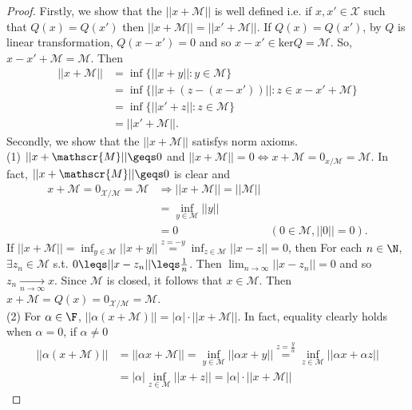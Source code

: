\begin{proof}
    Firstly, we show that the $||x+\mathscr{M}||$ is well defined i.e.
    if $x,x'\in\mathscr{X}$ such that $Q(x)=Q(x')$ then $||x+\mathscr{M}||=||x'+\mathscr{M}||$.
    If $Q(x)=Q(x')$, by $Q$ is linear transformation, $Q(x-x')=0$ and so $x-x'\in \text{ker}Q=\mathscr{M}$. 
    So, $x-x'+\mathscr{M}=\mathscr{M}$.
    Then
    \begin{align*}
        ||x+\mathscr{M}||&=\inf\{||x+y||:y\in\mathscr{M}\}\\
                        &=\inf\{||x+(z-(x-x'))||:z\in x-x'+\mathscr{M}\}\\
                        &=\inf\{||x'+z||:z\in \mathscr{M}\}\\
                        &=||x'+\mathscr{M}||.
    \end{align*}
    Secondly, we show that the $||x+\mathscr{M}||$ satisfys norm axioms.\\
    (1) $||x+\mathscr{M}||\geqs 0$ and $||x+\mathscr{M}||=0\Leftrightarrow x+\mathscr{M}=0_{x/\mathscr{M}}=\mathscr{M}$. 
    In fact, $||x+\mathscr{M}||\geqs 0$ is clear and 
    \begin{align*}
        x+\mathscr{M}=0_{\mathscr{X}/\mathscr{M}}=\mathscr{M}&\Rightarrow ||x+\mathscr{M}||=||\mathscr{M}||\\
        &= \inf_{y\in\mathscr{M}} ||y||\\
        & =0 & (0\in\mathscr{M},||0||=0).
    \end{align*}
        If $||x+\mathscr{M}||=\inf_{y\in\mathscr{M}}||x+y||\overset{z=-y}{=}\inf_{z\in \mathscr{M}}||x-z||=0$, 
        then For each  $n\in\N$, $\exists z_n\in\mathscr{M}$ s.t.
        $0\leqs||x-z_n||\leqs \frac{1}{n}$. Then $\lim_{n\rightarrow \infty}||x-z_n||=0$ and so $z_n\underset{n\rightarrow \infty}{\longrightarrow} x$.
        Since $\mathscr{M}$ is closed, it follows that $x\in\mathscr{M}$. Then $x+\mathscr{M}=Q(x)=0_{\mathscr{X}/\mathscr{M}}=\mathscr{M}$.\\
    (2) For $\alpha\in\F$, $||\alpha (x+\mathscr{M})||=|\alpha|\cdot||x+\mathscr{M}||$. In fact, equality clearly holds when $\alpha=0$, if $\alpha\neq 0$
    \begin{align*}
        ||\alpha(x+\mathscr{M})||&=||\alpha x+\mathscr{M}||=\inf_{y\in\mathscr{M}}||\alpha x+y||\overset{z=\frac{y}{\alpha}}{=}\inf_{z\in\mathscr{M}}||\alpha x+\alpha z||\\
                                &=|\alpha|\inf_{z\in\mathscr{M}} ||x+z|| =|\alpha|\cdot||x+\mathscr{M}||
    \end{align*}

\end{proof}
